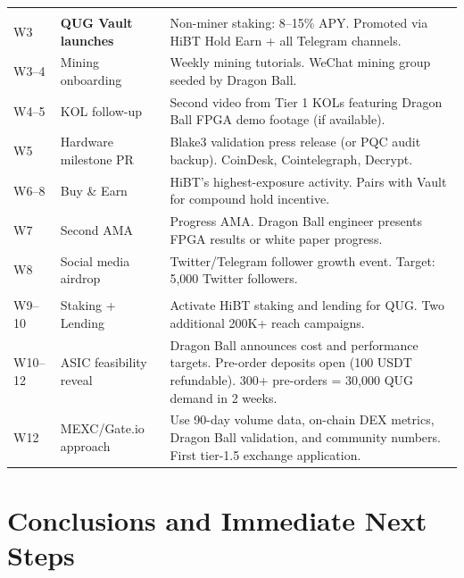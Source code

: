 \documentclass[11pt,a4paper]{article}
\begin{document}
\begin{center}
\begin{longtable}{C{2cm} L{4cm} L{8cm}}
   \\
  W3 & \textbf{QUG Vault launches} & Non-miner staking: 8--15\% APY. Promoted via HiBT Hold Earn + all Telegram channels. \\
  W3--4 & Mining onboarding & Weekly mining tutorials. WeChat mining group seeded by Dragon Ball. \\
  W4--5 & KOL follow-up & Second video from Tier 1 KOLs featuring Dragon Ball FPGA demo footage (if available). \\
  W5 & Hardware milestone PR & Blake3 validation press release (or PQC audit backup). CoinDesk, Cointelegraph, Decrypt. \\
  W6--8 & Buy \& Earn & HiBT's highest-exposure activity. Pairs with Vault for compound hold incentive. \\
  W7 & Second AMA & Progress AMA. Dragon Ball engineer presents FPGA results or white paper progress. \\
  W8 & Social media airdrop & Twitter/Telegram follower growth event. Target: 5,000 Twitter followers. \\

   \\
  W9--10 & Staking + Lending & Activate HiBT staking and lending for QUG. Two additional 200K+ reach campaigns. \\
  W10--12 & ASIC feasibility reveal & Dragon Ball announces cost and performance targets. Pre-order deposits open (100 USDT refundable). 300+ pre-orders = 30,000 QUG demand in 2 weeks. \\
  W12 & MEXC/Gate.io approach & Use 90-day volume data, on-chain DEX metrics, Dragon Ball validation, and community numbers. First tier-1.5 exchange application. \\
\end{longtable}
\end{center}

\section{Conclusions and Immediate Next Steps}
\end{document}
